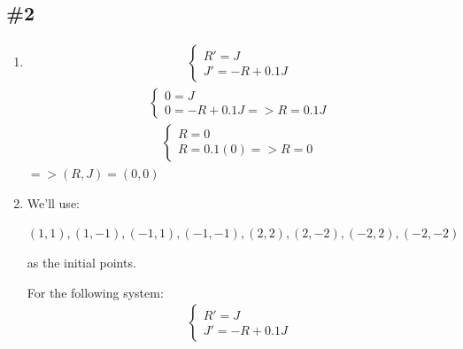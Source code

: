 \documentclass[12pt]{article}
\begin{document}
\subsection*{\#2}
\begin{enumerate}[label=\alph*.]
    \item \begin{align*}
        \begin{cases}
        R' = J \\
        J' = -R + 0.1J
        \end{cases}
    \end{align*}
    \begin{align*}
        \begin{cases}
        0 = J \\
        0 = -R + 0.1J => R = 0.1J
        \end{cases}
    \end{align*}
    \begin{align*}
        \begin{cases}
        R = 0 \\
        R = 0.1(0) => R = 0
        \end{cases}
    \end{align*}
    $=> (R,J) = (0,0)$
    \item We'll use:
    \begin{center}
    $(1,1), (1,-1), (-1,1), (-1,-1), (2,2), (2,-2), (-2, 2), (-2,-2)$ 
    \end{center}
    as the initial points.
    
    For the following system: 
    \begin{align*}
        \begin{cases}
        R' = J \\
        J' = -R + 0.1J
        \end{cases}
    \end{align*}


\end{enumerate}
\end{document}
